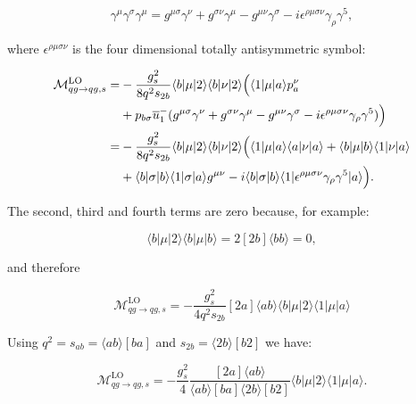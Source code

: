 			\begin{equation}
				\gamma^\mu\gamma^\sigma\gamma^\mu=g^{\mu\sigma}\gamma^\nu + g^{\sigma\nu}\gamma^\mu
				- g^{\mu\nu}\gamma^\sigma - i\epsilon^{\rho\mu\sigma\nu}\gamma_\rho\gamma^5,
			\end{equation}

			where $\epsilon^{\rho\mu\sigma\nu}$ is the four dimensional totally antisymmetric symbol:

			\begin{align}
			\begin{split}
				\mathcal{M}_{qg\rightarrow qg, s}^{\text{LO}} = &-\frac{g^2_s}{8q^2s_{2b}} \langle b | \mu | 2 \rangle \langle b | \nu | 2 \rangle \Big(\langle 1 | \mu | a \rangle p_a^\nu \\
				&+ p_{b\sigma}\overline{u}^-_1(g^{\mu\sigma}\gamma^\nu + g^{\sigma\nu}\gamma^\mu
				- g^{\mu\nu}\gamma^\sigma - i\epsilon^{\rho\mu\sigma\nu}\gamma_\rho\gamma^5)\Big)\\
				= &-\frac{g^2_s}{8q^2s_{2b}}\langle{b}|\mu|2\rangle\langle{b}|\nu|2\rangle
				\Big(\langle 1|\mu|a\rangle \langle a|\nu|a\rangle + \langle b|\mu|b\rangle
				\langle 1|\nu|a\rangle \\
				&+ \langle b|\sigma|b\rangle\langle1|\sigma|a\rangle
				g^{\mu\nu} - i\langle b|\sigma|b\rangle\langle 1|\epsilon^{\rho\mu\sigma\nu}\gamma_\rho\gamma^5|a\rangle\Big).
			\end{split}
			\end{align}

			The second, third and fourth terms are zero because, for example:

			\begin{equation}
				\langle b|\mu|2\rangle\langle b|\mu|b\rangle = 2[2b]\langle b b\rangle = 0,
			\end{equation}

			and therefore

			\begin{equation}
				\mathcal{M}_{qg\rightarrow qg, s}^{\text{LO}}=-\frac{g^2_s}{4q^2s_{2b}}[2a]\langle ab\rangle\langle{b}|\mu|2\rangle\langle{1}|\mu|a\rangle
			\end{equation}

			Using $q^2=s_{ab}=\langle ab\rangle[ba]$ and $s_{2b}=\langle2b\rangle[b2]$ we have:

			\begin{equation}
			\mathcal{M}_{qg\rightarrow qg, s}^{\text{LO}}=-\frac{g^2_s}{4}\frac{[2a]\langle ab\rangle}{\langle ab\rangle[ba]
			\langle2b\rangle[b2]}\langle{b}|\mu|2\rangle\langle{1}|\mu|a\rangle.
			\end{equation}

